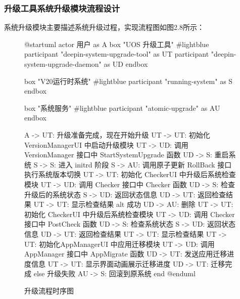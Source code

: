 \documentclass{utart}
\begin{document}
\subsubsection{升级工具系统升级模块流程设计}
系统升级模块主要描述系统升级过程，实现流程图如图2.8所示：
\begin{figure}[H]
    \centering
    \begin{plantuml}
        @startuml
        actor 用户 as A 
        box "UOS 升级工具" #lightblue
        participant "deepin-system-upgrade-tool" as UT
        participant "deepin-system-upgrade-daemon" as UD                             
        endbox

        box "V20运行时系统" #lightblue
        participant "running-system" as S
        endbox

        box "系统服务" #lightblue 
        participant "atomic-upgrade" as AU
        endbox

        A -> UT: 升级准备完成，现在开始升级
        UT -> UT: 初始化 VersionManagerUI 中启动升级模块
        UT -> UD: 调用 VersionManager 接口中 StartSystemUpgrade 函数
        UD -> S: 重启系统
        S -> S: 进入 initrd 阶段
        S -> AU: 调用原子更新 RollBack 接口执行系统版本切换
        UT -> UT: 初始化 CheckerUI 中升级后系统检查模块
        UT -> UD: 调用 Checker 接口中 Checker 函数
        UD -> S: 检查升级后的系统状态
        S -> UD: 返回状态信息
        UD -> UT: 返回检查结果
        UT -> UT: 显示检查结果
        alt 成功
        UD -> AU: 删除
        UT -> UT: 初始化 CheckerUI 中升级后系统检查模块
        UT -> UD: 调用 Checker 接口中 PostCheck 函数
        UD -> S: 检查系统状态
        S -> UD: 返回状态信息
        UD -> UT: 返回检查结果
        UT -> UT: 显示检查结果
        UT -> UT: 初始化AppManagerUI 中应用迁移模块
        UT -> UD: 调用AppManager 接口中 AppMigrate 函数
        UD -> UT: 发送应用迁移进度信息
        UT -> UT: 显示界面动画展示迁移进度
        UD -> UT: 迁移完成
        else 升级失败
        AU -> S: 回滚到原系统
        end
        @enduml
    \end{plantuml}
    \caption{升级流程时序图}
    \label{fig:upgrade}
\end{figure}
\end{document}
